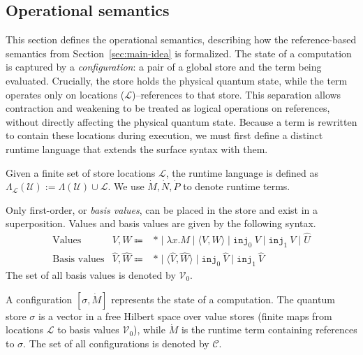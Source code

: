 \subsection{Operational semantics}
This section defines the operational semantics, describing how the reference-based semantics from Section~\ref{sec:main-idea} is formalized.
The state of a computation is captured by a \textit{configuration}: a pair of a global store and the term being evaluated.
Crucially, the store holds the physical quantum state, while the term operates only on locations ($\mathcal{L}$)--references to that store.
This separation allows contraction and weakening to be treated as logical operations on references, without directly affecting the physical quantum state.
Because a term is rewritten to contain these locations during execution, we must first define a distinct runtime language that extends the surface syntax with them.

\begin{dfn}
  Given a finite set of store locations $\mathcal{L}$, the runtime language is defined as $\Lambda_\mathcal{L}(\mathcal{U}) := \Lambda(\mathcal{U})\cup\mathcal{L}$.
  We use $\dot{M}, \dot{N}, \dot{P}$ to denote runtime terms.
\end{dfn}

Only first-order, or \textit{basis values}, can be placed in the store and exist in a superposition.
Values and basis values are given by the following syntax.
\begin{equation*}
  \begin{array}{lrl}
    \text{Values}       & V, W \Coloneqq             & *\mid\lambda x. M\mid\langle V, W\rangle\mid\texttt{inj}_0\ V\mid\texttt{inj}_1\ V\mid\hat{U} \\
    \text{Basis values} & \hat{V}, \hat{W} \Coloneqq & *\mid\langle\hat{V}, \hat{W}\rangle\mid\texttt{inj}_0\ \hat{V}\mid\texttt{inj}_1\ \hat{V}
  \end{array}
\end{equation*}
The set of all basis values is denoted by $\mathcal{V}_0$.

A configuration $[\sigma, \dot{M}]$ represents the state of a computation.
The quantum store $\sigma$ is a vector in a free Hilbert space over value stores (finite maps from locations $\mathcal{L}$ to basis values $\mathcal{V}_0$), while $\dot{M}$ is the runtime term containing references to $\sigma$.
The set of all configurations is denoted by $\mathcal{C}$.

